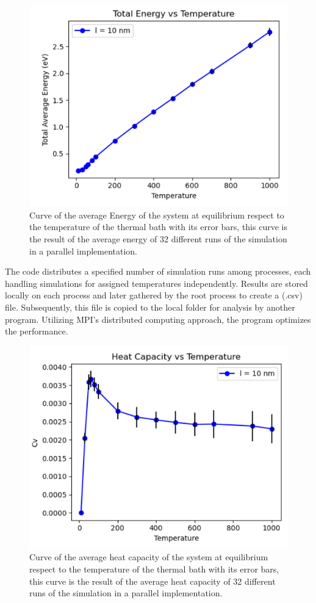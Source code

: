 \documentclass[%
 reprint,
 amsmath,amssymb,
 aps,
]{revtex4-2}
\begin{document}
\begin{figure}[h!]
    \centering
    \includegraphics[width = 0.7 \linewidth]{EANDT.png}
    \caption{Curve of the average Energy of the system at equilibrium respect to the temperature of the thermal bath with its error bars, this curve is the result of the average energy of 32 different runs of the simulation in a parallel implementation.}
    \label{fig:epar}
\end{figure}

 The code distributes a specified number of simulation runs among processes, each handling simulations for assigned temperatures independently. Results are stored locally on each process and later gathered by the root process to create a (.csv) file. Subsequently, this file is copied to the local folder for analysis by another program. Utilizing MPI's distributed computing approach, the program optimizes the performance. 



\begin{figure}[h!]
    \centering
    \includegraphics[width = 0.7 \linewidth]{CVANDTEMP.png}
    \caption{Curve of the average heat capacity of the system at equilibrium respect to the temperature of the thermal bath with its error bars, this curve is the result of the average heat capacity of 32 different runs of the simulation in a parallel implementation.}
    \label{fig:cvpar}
\end{figure}
\end{document}
